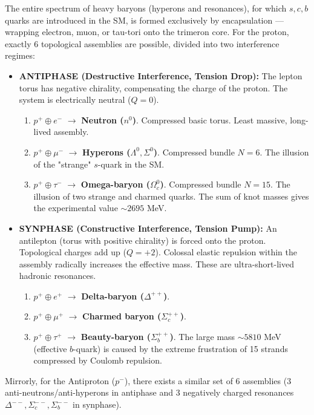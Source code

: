 \documentclass[11pt,a4paper]{article}
\begin{document}
The entire spectrum of heavy baryons (hyperons and resonances), for which $s, c, b$ quarks are introduced in the SM, is formed exclusively by encapsulation — wrapping electron, muon, or tau-tori onto the trimeron core. For the proton, exactly 6 topological assemblies are possible, divided into two interference regimes:
\begin{itemize}
    \item \textbf{ANTIPHASE (Destructive Interference, Tension Drop):} The lepton torus has negative chirality, compensating the charge of the proton. The system is electrically neutral ($Q=0$).
    \begin{enumerate}
        \item $p^+ \oplus e^-$ $\longrightarrow$ \textbf{Neutron ($n^0$)}. Compressed basic torus. Least massive, long-lived assembly.
        \item $p^+ \oplus \mu^-$ $\longrightarrow$ \textbf{Hyperons ($\Lambda^0, \Sigma^0$)}. Compressed bundle $N=6$. The illusion of the "strange" $s$-quark in the SM.
        \item $p^+ \oplus \tau^-$ $\longrightarrow$ \textbf{Omega-baryon ($\Omega_c^0$)}. Compressed bundle $N=15$. The illusion of two strange and charmed quarks. The sum of knot masses gives the experimental value $\sim 2695$ MeV.
    \end{enumerate}
    
    \item \textbf{SYNPHASE (Constructive Interference, Tension Pump):} An antilepton (torus with positive chirality) is forced onto the proton. Topological charges add up ($Q=+2$). Colossal elastic repulsion within the assembly radically increases the effective mass. These are ultra-short-lived hadronic resonances.
    \begin{enumerate}
        \item $p^+ \oplus e^+$ $\longrightarrow$ \textbf{Delta-baryon ($\Delta^{++}$)}.
        \item $p^+ \oplus \mu^+$ $\longrightarrow$ \textbf{Charmed baryon ($\Sigma_c^{++}$)}.
        \item $p^+ \oplus \tau^+$ $\longrightarrow$ \textbf{Beauty-baryon ($\Sigma_b^{++}$)}. The large mass $\sim 5810$ MeV (effective $b$-quark) is caused by the extreme frustration of 15 strands compressed by Coulomb repulsion.
    \end{enumerate}
\end{itemize}

Mirrorly, for the Antiproton ($p^-$), there exists a similar set of 6 assemblies (3 anti-neutrons/anti-hyperons in antiphase and 3 negatively charged resonances $\Delta^{--}, \Sigma_c^{--}, \Sigma_b^{--}$ in synphase).
\end{document}
